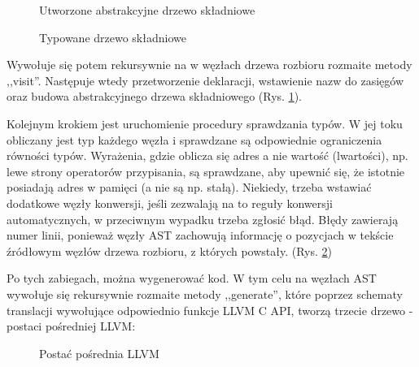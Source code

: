 \begin{landscape}
\begin{figure}[p]
    \centering
    
    \caption{Utworzone abstrakcyjne drzewo składniowe}
    \label{img_ast}
\end{figure}
\end{landscape}

\begin{landscape}
\begin{figure}[p]
    \centering
    
    \caption{Typowane drzewo składniowe}
    \label{img_tpast}
\end{figure}
\end{landscape}
Wywołuje się potem rekursywnie na w węzłach drzewa rozbioru rozmaite metody ,,visit''. Następuje wtedy przetworzenie deklaracji, wstawienie nazw do zasięgów oraz budowa abstrakcyjnego drzewa składniowego (Rys. \ref{img_ast}).

Kolejnym krokiem jest uruchomienie procedury sprawdzania typów. W jej toku obliczany jest typ każdego węzła i sprawdzane są odpowiednie ograniczenia równości typów. Wyrażenia, gdzie oblicza się adres a nie wartość (lwartości), np. lewe strony operatorów przypisania, są sprawdzane, aby upewnić się, że istotnie posiadają adres w pamięci (a nie są np. stałą). Niekiedy, trzeba wstawiać dodatkowe węzły konwersji, jeśli zezwalają na to reguły konwersji automatycznych, w przeciwnym wypadku trzeba zgłosić błąd. Błędy zawierają numer linii, ponieważ węzły AST zachowują informację o pozycjach w tekście źródłowym węzłów drzewa rozbioru, z których powstały. (Rys. \ref{img_tpast})

Po tych zabiegach, można wygenerować kod. W tym celu na węzłach AST wywołuje się rekursywnie rozmaite metody ,,generate'', które poprzez schematy translacji wywołujące odpowiednio funkcje LLVM C API, tworzą trzecie drzewo - postaci pośredniej LLVM: 

\begin{figure}[h]
    \centering
    
    \caption{Postać pośrednia LLVM }
\end{figure}

